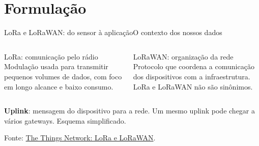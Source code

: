 \section{Formulação}
\begin{frame}{LoRa e LoRaWAN: do sensor à aplicação}{O contexto dos nossos dados}
\begin{columns}[T]
\begin{block}{LoRa: comunicação pelo rádio}
Modulação usada para transmitir pequenos volumes de dados, com foco em longo alcance e baixo consumo.
\end{block}
\begin{block}{LoRaWAN: organização da rede}
Protocolo que coordena a comunicação dos dispositivos com a infraestrutura. LoRa e LoRaWAN não são sinônimos.
\end{block}
\end{columns}
\vspace{3mm}
\centering
{}
\par\vspace{3mm}
\raggedright
\small \textbf{Uplink}: mensagem do dispositivo para a rede. Um mesmo uplink pode chegar a vários gateways. Esquema simplificado.
\par\scriptsize Fonte: \href{https://www.thethingsnetwork.org/docs/lorawan/what-is-lorawan/}{The Things Network: LoRa e LoRaWAN}.
\end{frame}

